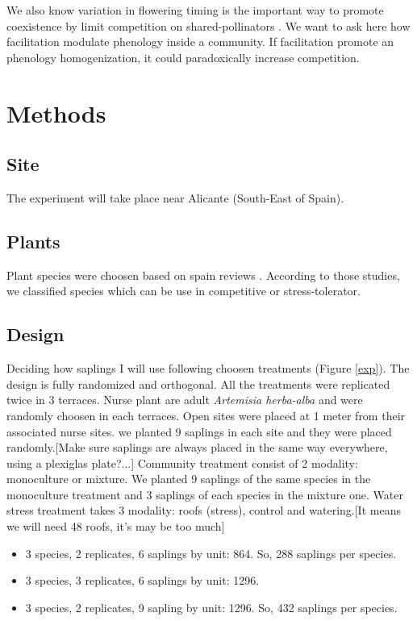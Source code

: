\documentclass[12pt]{article} %
\begin{document}
We also know variation in flowering timing is the important way to promote coexistence by limit competition on shared-pollinators \citep{Cleland2006}. We want to ask here how facilitation modulate phenology inside a community. If facilitation promote an phenology homogenization, it could paradoxically increase competition. 


\section{Methods}

\subsection{Site}

The experiment will take place near Alicante (South-East of Spain).
\subsection{Plants}

Plant species were choosen based on spain reviews \citep{McCluney2012,Navarro2006, Jauffret2003}. According to those studies, we classified species which can be use in competitive or stress-tolerator. 



\subsection{Design}

Deciding how saplings I will use following choosen treatments (Figure \ref{exp}). The design is fully randomized and orthogonal. All the treatments were replicated twice in 3 terraces. Nurse plant are adult \textit{Artemisia herba-alba} and were randomly choosen in each terraces. Open sites were placed at 1 meter from their associated nurse sites. we planted 9 saplings in each site and they were placed randomly.[Make sure saplings are always placed in the same way everywhere, using a plexiglas plate?...] Community treatment consist of 2 modality: monoculture or mixture. We planted 9 saplings of the same species in the monoculture treatment and 3 saplings of each species in the mixture one. Water stress treatment takes 3 modality: roofs (stress), control and watering.[It means we will need 48 roofs, it's may be too much]

\begin{itemize}
\item 3 species, 2 replicates, 6 saplings by unit: 864. So, 288 saplings per species.
\item 3 species, 3 replicates, 6 saplings by unit: 1296.
\item 3 species, 2 replicates, 9 sapling by unit: 1296. So, 432 saplings per species.
\end{itemize}
\end{document}
